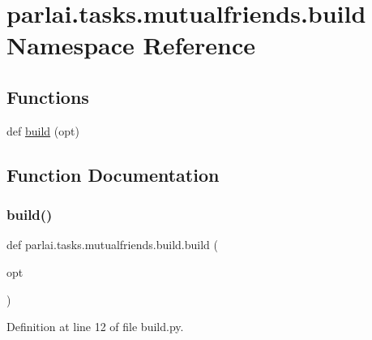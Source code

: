 \hypertarget{namespaceparlai_1_1tasks_1_1mutualfriends_1_1build}{}\section{parlai.\+tasks.\+mutualfriends.\+build Namespace Reference}
\label{namespaceparlai_1_1tasks_1_1mutualfriends_1_1build}
\subsection*{Functions}
\begin{DoxyCompactItemize}
\item 
def \hyperlink{namespaceparlai_1_1tasks_1_1mutualfriends_1_1build_ab42304948cd357bcb503986b9e4bae7a}{build} (opt)
\end{DoxyCompactItemize}


\subsection{Function Documentation}
\mbox{\label{namespaceparlai_1_1tasks_1_1mutualfriends_1_1build_ab42304948cd357bcb503986b9e4bae7a}} 
\subsubsection{\texorpdfstring{build()}{build()}}
{\footnotesize\ttfamily def parlai.\+tasks.\+mutualfriends.\+build.\+build (\begin{DoxyParamCaption}\item[{}]{opt }\end{DoxyParamCaption})}



Definition at line 12 of file build.\+py.

